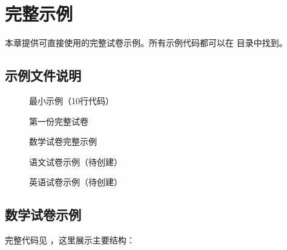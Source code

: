 
\section{完整示例}

本章提供可直接使用的完整试卷示例。所有示例代码都可以在  目录中找到。

\subsection{示例文件说明}

\begin{description}
  \item[] 最小示例（10行代码）
  \item[] 第一份完整试卷
  \item[] 数学试卷完整示例
  \item[] 语文试卷示例（待创建）
  \item[] 英语试卷示例（待创建）
\end{description}

\subsection{数学试卷示例}

完整代码见 ，这里展示主要结构：

